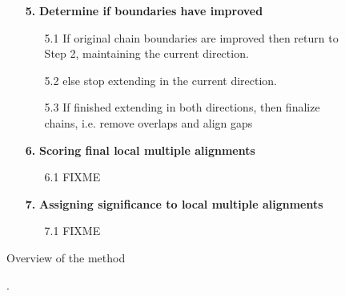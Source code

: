 \documentclass{llncs}
\begin{document}
\begin{figure}[t]
\begin{center}
\begin{minipage}[t]{.50\textwidth}
\begin{flushleft}
\begin{enumerate}
\item[\textbf{5.}] \textbf{Determine if boundaries have improved}
\begin{enumerate}
\item[5.1] If original chain boundaries are improved then
return to Step 2, maintaining the current direction.

\item[5.2] else stop extending in the current direction.
\item[5.3] If finished extending in both directions, then
finalize chains, i.e. remove overlaps and align gaps


\end{enumerate}
\item[\textbf{6.}] \textbf{Scoring final local multiple alignments}
\begin{enumerate}
\item[6.1] FIXME
\end{enumerate}
\item[\textbf{7.}] \textbf{Assigning significance to local multiple alignments}
\begin{enumerate}
\item[7.1] FIXME
\end{enumerate}

\end{enumerate}

\end{flushleft}
 \end{minipage}
 \hfill
 \begin{minipage}[t]{.30\textwidth}
 \begin{flushleft}

\end{flushleft}
\end{minipage}
\hfill
\end{center}
\caption{Overview of the method}
\end{figure}
\begin{figure}[t]
\centering {}
\caption{.}

\label{fig:string_matching}\vspace{-0.2cm}
\end{figure}

\begin{comment}
\begin{algorithm}{Allocate-Object}{}
\begin{IF}{free = \NIL}
\ERROR{out of space}
\ELSE
x \= free \\
free \= next[x] \\
\RETURN x
\end{IF}
\end{algorithm}
\end{comment}
\end{document}
